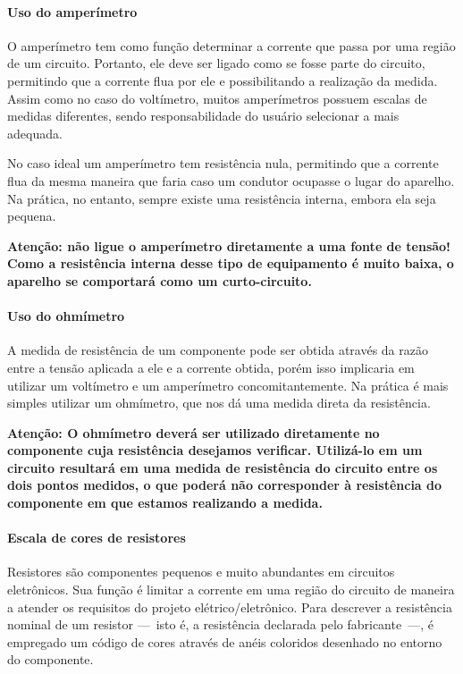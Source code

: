 \paragraph{Uso do amperímetro}

O amperímetro tem como função determinar a corrente que passa por uma região de um circuito. Portanto, ele deve ser ligado como se fosse parte do circuito, permitindo que a corrente flua por ele e possibilitando a realização da medida. Assim como no caso do voltímetro, muitos amperímetros possuem escalas de medidas diferentes, sendo responsabilidade do usuário selecionar a mais adequada.

No caso ideal um amperímetro tem resistência nula, permitindo que a corrente flua da mesma maneira que faria caso um condutor ocupasse o lugar do aparelho. Na prática, no entanto, sempre existe uma resistência interna, embora ela seja pequena.

\textbf{Atenção: não ligue o amperímetro diretamente a uma fonte de tensão! Como a resistência interna desse tipo de equipamento é muito baixa, o aparelho se comportará como um curto-circuito.}

\paragraph{Uso do ohmímetro}

A medida de resistência de um componente pode ser obtida através da razão entre a tensão aplicada a ele e a corrente obtida, porém isso implicaria em utilizar um voltímetro e um amperímetro concomitantemente. Na prática é mais simples utilizar um ohmímetro, que nos dá uma medida direta da resistência.

\textbf{Atenção: O ohmímetro deverá ser utilizado diretamente no componente cuja resistência desejamos verificar. Utilizá-lo em um circuito resultará em uma medida de resistência do circuito entre os dois pontos medidos, o que poderá não corresponder à resistência do componente em que estamos realizando a medida.}

\paragraph{Escala de cores de resistores}

Resistores são componentes pequenos e muito abundantes em circuitos eletrônicos. Sua função é limitar a corrente em uma região do circuito de maneira a atender os requisitos do projeto elétrico/eletrônico. Para descrever a resistência nominal de um resistor ---~isto é, a resistência declarada pelo fabricante~---, é empregado um código de cores através de anéis coloridos desenhado no entorno do componente.

